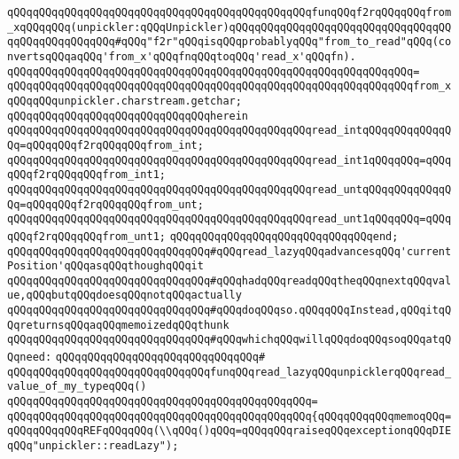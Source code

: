 \verb|qQQqqQQqqQQqqQQqqQQqqQQqqQQqqQQqqQQqqQQqqQQqqQQqfunqQQqf2rqQQqqQQqfrom_xqQQqqQQq(unpickler:qQQqUnpickler)qQQqqQQqqQQqqQQqqQQqqQQqqQQqqQQqqQQqqQQqqQQqqQQqqQQq#qQQq"f2r"qQQqisqQQqprobablyqQQq"from_to_read"qQQq(convertsqQQqaqQQq'from_x'qQQqfnqQQqtoqQQq'read_x'qQQqfn).|\newline
\verb|qQQqqQQqqQQqqQQqqQQqqQQqqQQqqQQqqQQqqQQqqQQqqQQqqQQqqQQqqQQqqQQq=|\newline
\verb|qQQqqQQqqQQqqQQqqQQqqQQqqQQqqQQqqQQqqQQqqQQqqQQqqQQqqQQqqQQqqQQqfrom_xqQQqqQQqunpickler.charstream.getchar;|\newline
\verb|qQQqqQQqqQQqqQQqqQQqqQQqqQQqqQQqherein|\newline
\verb|qQQqqQQqqQQqqQQqqQQqqQQqqQQqqQQqqQQqqQQqqQQqqQQqread_intqQQqqQQqqQQqqQQq=qQQqqQQqf2rqQQqqQQqfrom_int;|\newline
\verb|qQQqqQQqqQQqqQQqqQQqqQQqqQQqqQQqqQQqqQQqqQQqqQQqread_int1qQQqqQQq=qQQqqQQqf2rqQQqqQQqfrom_int1;|\newline
\verb|qQQqqQQqqQQqqQQqqQQqqQQqqQQqqQQqqQQqqQQqqQQqqQQqread_untqQQqqQQqqQQqqQQq=qQQqqQQqf2rqQQqqQQqfrom_unt;|\newline
\verb|qQQqqQQqqQQqqQQqqQQqqQQqqQQqqQQqqQQqqQQqqQQqqQQqread_unt1qQQqqQQq=qQQqqQQqf2rqQQqqQQqfrom_unt1;|\newline
\verb|qQQqqQQqqQQqqQQqqQQqqQQqqQQqqQQqend;|\newline
\newline
\newline
\verb|qQQqqQQqqQQqqQQqqQQqqQQqqQQqqQQq#qQQqread_lazyqQQqadvancesqQQq'currentPosition'qQQqasqQQqthoughqQQqit|\newline
\verb|qQQqqQQqqQQqqQQqqQQqqQQqqQQqqQQq#qQQqhadqQQqreadqQQqtheqQQqnextqQQqvalue,qQQqbutqQQqdoesqQQqnotqQQqactually|\newline
\verb|qQQqqQQqqQQqqQQqqQQqqQQqqQQqqQQq#qQQqdoqQQqso.qQQqqQQqInstead,qQQqitqQQqreturnsqQQqaqQQqmemoizedqQQqthunk|\newline
\verb|qQQqqQQqqQQqqQQqqQQqqQQqqQQqqQQq#qQQqwhichqQQqwillqQQqdoqQQqsoqQQqatqQQqneed:|\newline
\verb|qQQqqQQqqQQqqQQqqQQqqQQqqQQqqQQq#|\newline
\verb|qQQqqQQqqQQqqQQqqQQqqQQqqQQqqQQqfunqQQqread_lazyqQQqunpicklerqQQqread_value_of_my_typeqQQq()|\newline
\verb|qQQqqQQqqQQqqQQqqQQqqQQqqQQqqQQqqQQqqQQqqQQqqQQq=|\newline
\verb|qQQqqQQqqQQqqQQqqQQqqQQqqQQqqQQqqQQqqQQqqQQqqQQq{qQQqqQQqqQQqmemoqQQq=qQQqqQQqqQQqREFqQQqqQQq(\\qQQq()qQQq=qQQqqQQqraiseqQQqexceptionqQQqDIEqQQq"unpickler::readLazy");|\newline
